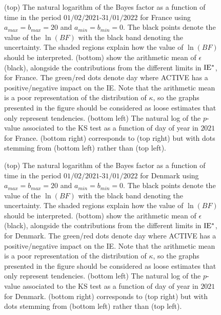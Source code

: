 \documentclass[fleqn,usenatbib,nofootinbib]{revtex4-2}
\begin{document}
\begin{appendices}
		\begin{figure}[H]
			\caption{\label{fig:a1} (top) The natural logarithm of the Bayes factor as a function of time in the period $01/02/2021$-$31/01/2022$ for France using $a_{max}=b_{max}=20$ and $a_{min}=b_{min}=0$. The black points denote the value of the $\ln(BF)$ with the black band denoting the uncertainty. The shaded regions explain how the value of $\ln(BF)$ should be interpreted. (bottom) show the arithmetic mean of $\epsilon$ (black), alongside the contributions from the different limits in $\rm IE^*$, for France. The green/red dots denote day where ACTIVE has a positive/negative impact on the IE. Note that the arithmetic mean is a poor representation of the distribution of $\kappa$, so the graphs presented in the figure should be considered as loose estimates that only represent tendencies. (bottom left) The natural log of the $p$-value associated to the KS test as a function of day of year in $2021$ for France. (bottom right) corresponds to (top right) but with dots stemming from (bottom left) rather than (top left).}
		\end{figure}
		
		\begin{figure}[H]
			\caption{\label{fig:a2} (top) The natural logarithm of the Bayes factor as a function of time in the period $01/02/2021$-$31/01/2022$ for Denmark using $a_{max}=b_{max}=20$ and $a_{min}=b_{min}=0$. The black points denote the value of the $\ln(BF)$ with the black band denoting the uncertainty. The shaded regions explain how the value of $\ln(BF)$ should be interpreted. (bottom) show the arithmetic mean of $\epsilon$ (black), alongside the contributions from the different limits in $\rm IE^*$, for Denmark. The green/red dots denote day where ACTIVE has a positive/negative impact on the IE. Note that the arithmetic mean is a poor representation of the distribution of $\kappa$, so the graphs presented in the figure should be considered as loose estimates that only represent tendencies. (bottom left) The natural log of the $p$-value associated to the KS test as a function of day of year in $2021$ for Denmark. (bottom right) corresponds to (top right) but with dots stemming from (bottom left) rather than (top left).}
		\end{figure}
		

\end{appendices}
\end{document}
